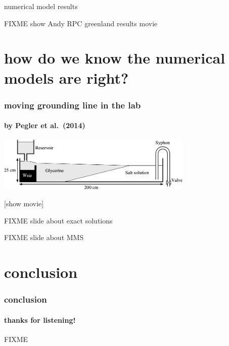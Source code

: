 \documentclass[10pt,hyperref={pdfpagelabels=true}]{beamer}
\begin{document}
\begin{frame}{numerical model results}

FIXME show Andy RPC greenland results movie
\end{frame}


\section[on being right]{how do we know the numerical models are right?}

\begin{frame}
  \frametitle{moving grounding line in the lab}
  \framesubtitle{by Pegler et al.~(2014)}

\begin{center}

\includegraphics[width=0.7\textwidth]{pegler2014-grounding-line-schematic}

\vspace{1.0in}
[show movie]
\end{center}
\end{frame}


\begin{frame}{FIXME slide about exact solutions}
\end{frame}


\begin{frame}{FIXME slide about MMS}
\end{frame}



\section*{conclusion}

\begin{frame}
  \frametitle{conclusion}
  \framesubtitle{thanks for listening!}

\begin{center}
FIXME
\end{center}

\end{frame}
\end{document}
